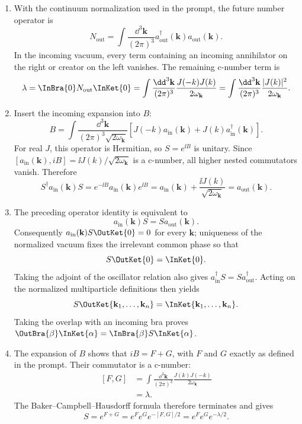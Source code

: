 \begin{enumerate}
\begin{enumerate}
\item
With the continuum normalization used in the prompt, the future number
operator is
\[
 N_{\mathrm{out}}=\int\frac{\dd^3\mathbf k}{(2\pi)^3}
 a_{\mathrm{out}}^\dagger(\mathbf k)a_{\mathrm{out}}(\mathbf k).
\]
In the incoming vacuum, every term containing an incoming annihilator on the
right or creator on the left vanishes.  The remaining c-number term is
\[
 \lambda=\InBra{0}N_{\mathrm{out}}\InKet{0}
 =\int\frac{\dd^3\mathbf k}{(2\pi)^3}
 \frac{J(-k)J(k)}{2\omega_{\mathbf k}}
 =\int\frac{\dd^3\mathbf k}{(2\pi)^3}
 \frac{|J(k)|^2}{2\omega_{\mathbf k}}.
\]

\item
Insert the incoming expansion into \(B\):
\[
 B=\int\frac{\dd^3\mathbf k}{(2\pi)^3\sqrt{2\omega_{\mathbf k}}}
 \left[J(-k)a_{\mathrm{in}}(\mathbf k)
 +J(k)a_{\mathrm{in}}^\dagger(\mathbf k)\right].
\]
For real \(J\), this operator is Hermitian, so \(S=e^{\ii B}\) is unitary.  Since
\([a_{\mathrm{in}}(\mathbf k),iB]
=\ii J(k)/\sqrt{2\omega_{\mathbf k}}\) is a c-number, all higher nested
commutators vanish.  Therefore
\[
 S^\dagger a_{\mathrm{in}}(\mathbf k)S
 =e^{-\ii B}a_{\mathrm{in}}(\mathbf k)e^{\ii B}
 =a_{\mathrm{in}}(\mathbf k)
 +\frac{\ii J(k)}{\sqrt{2\omega_{\mathbf k}}}
 =a_{\mathrm{out}}(\mathbf k).
\]

\item
The preceding operator identity is equivalent to
\[
 a_{\mathrm{in}}(\mathbf k)S
 =S a_{\mathrm{out}}(\mathbf k).
\]
Consequently \(a_{\mathrm{in}}(\mathbf k)S\OutKet{0}=0\) for every
\(\mathbf k\); uniqueness of the normalized vacuum fixes the irrelevant
common phase so that
\[
 S\OutKet{0}=\InKet{0}.
\]
Taking the adjoint of the oscillator relation also gives
\(a_{\mathrm{in}}^\dagger S=S a_{\mathrm{out}}^\dagger\).  Acting on the
normalized multiparticle definitions then yields
\[
 S\OutKet{\mathbf k_1,\ldots,\mathbf k_n}
 =\InKet{\mathbf k_1,\ldots,\mathbf k_n}.
\]
Taking the overlap with an incoming bra proves
\(\OutBra{\beta}\InKet{\alpha}
=\InBra{\beta}S\InKet{\alpha}\).

\item
The expansion of \(B\) shows that \(iB=F+G\), with \(F\) and \(G\) exactly as
defined in the prompt.  Their commutator is a c-number:
\[
 \begin{split}
 [F,G]
 &=\int\frac{\dd^3\mathbf k}{(2\pi)^3}
 \frac{J(k)J(-k)}{2\omega_{\mathbf k}}\\
 &=\lambda.
 \end{split}
\]
The Baker--Campbell--Hausdorff formula therefore terminates and gives
\[
 S=e^{F+G}=e^F e^G e^{-[F,G]/2}
 =e^F e^G e^{-\lambda/2}.
\]


\end{enumerate}
\end{enumerate}
